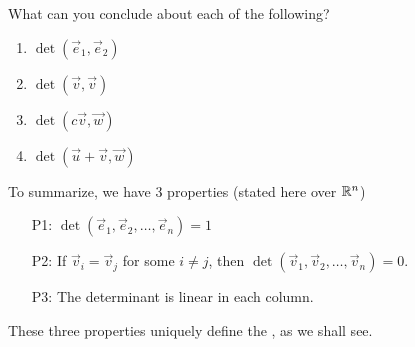 \begin{applicationActivities}{1}{25}
\begin{activity}{0}
\begin{minipage}{0.8\textwidth}
\begin{multicols}{2}
\begin{center}
\end{center}

\begin{center}
\end{center}

\end{multicols}
\end{minipage}

\end{activity}

\begin{activity}{0}
What can you conclude about each of the following?
\begin{enumerate}
\item $\det(\vec{e}_1,\vec{e}_2)$
\item $\det(\vec{v},\vec{v})$
\item $\det(c\vec{v},\vec{w})$
\item $\det(\vec{u}+\vec{v},\vec{w})$
\end{enumerate}
\end{activity}


\begin{definition}
To summarize, we have 3 properties (stated here over $\mathbb{R}^n$)
\begin{enumerate}
\item [P1:] $\det(\vec{e}_1,\vec{e}_2,\ldots,\vec{e}_n)=1$
\item [P2:] If $\vec{v}_i = \vec{v}_j$ for some $i \neq j$, then $\det(\vec{v}_1,\vec{v}_2,\ldots,\vec{v}_n)=0$.
\item[P3:] The determinant is linear in each column.
\end{enumerate}

These three properties uniquely define the , as we shall see.
\end{definition}


\end{applicationActivities}

